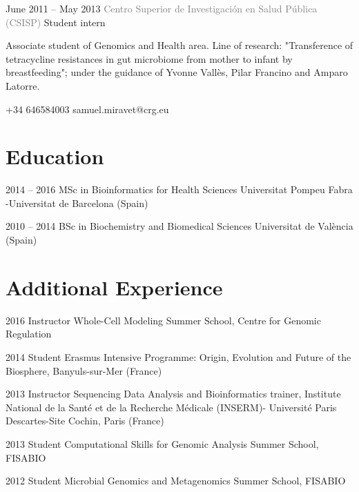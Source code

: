 \documentclass{tccv}
\begin{document}
\begin{eventlist}
\item{June 2011 -- May 2013}
     {\textcolor{gray}{Centro Superior de Investigación en Salud Pública (CSISP)}}
     {Student intern}

Associate student of Genomics and Health area. Line of research: "Transference of tetracycline resistances in gut microbiome from mother to infant by breastfeeding"; under the guidance of Yvonne Vallès, Pilar Francino and Amparo Latorre.

\end{eventlist}

    {+34 646584003}
    {samuel.miravet@crg.eu}

\section{Education}

\begin{yearlist}

\item{2014 -- 2016}
     {MSc in Bioinformatics for Health Sciences}
     {Universitat Pompeu Fabra -\newline Universitat de Barcelona (Spain)}

\item{2010 -- 2014}
     {BSc in Biochemistry and Biomedical Sciences}
     {Universitat de València (Spain)}

\end{yearlist}

\section{Additional Experience}

\begin{yearlist}

\item{2016}
     {Instructor}
     {Whole-Cell Modeling Summer School, Centre for Genomic Regulation}

\item{2014}
     {Student}
     {Erasmus Intensive Programme: Origin, Evolution and Future of the Biosphere, Banyuls-sur-Mer (France)}

\item{2013}
	{Instructor}
	{Sequencing Data Analysis and Bioinformatics trainer, Institute National de la Santé et de la Recherche Médicale (INSERM)- Université Paris Descartes-Site Cochin, Paris (France)}

\item{2013}
     {Student}
     {Computational Skills for Genomic Analysis Summer School, FISABIO}

\item{2012}
	{Student}
	{Microbial Genomics and Metagenomics Summer School, FISABIO}

\end{yearlist}
\end{document}
